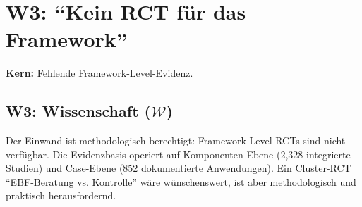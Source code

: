 \section{W3: ``Kein RCT für das Framework''}
\label{sec:da2-w3}

\begin{tcolorbox}[colback=red!5!white, colframe=red!75!black,
    title=W3: ``Wo ist der RCT, der zeigt, dass EBF besser ist?'']
\textbf{Kern:} Fehlende Framework-Level-Evidenz.
\end{tcolorbox}

\subsection{W3: Wissenschaft ($\mathcal{W}$)}

\begin{tcolorbox}[colback=green!5!white, colframe=green!75!black,
    title=W3-$\mathcal{W}$-K: Kurz (Wissenschaft)]

Der Einwand ist methodologisch berechtigt: Framework-Level-RCTs sind nicht verfügbar. Die Evidenzbasis operiert auf Komponenten-Ebene (2,328 integrierte Studien) und Case-Ebene (852 dokumentierte Anwendungen). Ein Cluster-RCT ``EBF-Beratung vs. Kontrolle'' wäre wünschenswert, ist aber methodologisch und praktisch herausfordernd.

\end{tcolorbox}

